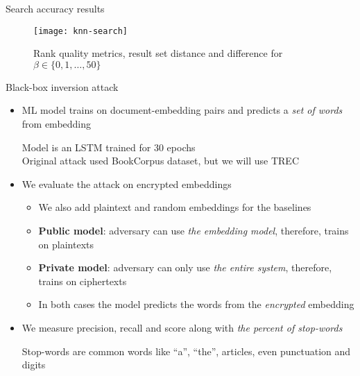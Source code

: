 	\begin{frame}{Search accuracy results}

		\begin{figure}[h]
			\centering
			\texttt{[image: knn-search]}
			\caption{Rank quality metrics, result set distance and difference for $\beta \in \{ 0, 1, \ldots , 50 \} $}
		\end{figure}

	\end{frame}

	\begin{frame}{Black-box inversion attack \cite{embedding-attacks}}

		\begin{itemize}
			\item<1->
				ML model trains on document-embedding pairs and predicts a \emph{set of words} from embedding \\
				\begin{small}
					\indent{} Model is an LSTM trained for 30 epochs \\
					\indent{} Original attack used BookCorpus \cite{bookcorpus} dataset, but we will use TREC
				\end{small}

			\item<2->
				We evaluate the attack on encrypted embeddings
				\begin{itemize}
					\item We also add plaintext and random embeddings for the baselines
					\item \textbf{Public model}: adversary can use \emph{the embedding model}, therefore, trains on plaintexts
					\item \textbf{Private model}: adversary can only use \emph{the entire system}, therefore, trains on ciphertexts
					\item In both cases the model predicts the words from the \emph{encrypted} embedding
				\end{itemize}

			\item<3->
				We measure precision, recall and \FOne{} score along with \emph{the percent of stop-words} \\
				\begin{small}
					\indent{} Stop-words are common words like ``a'', ``the'', articles, even punctuation and digits
				\end{small}

		\end{itemize}

	\end{frame}

